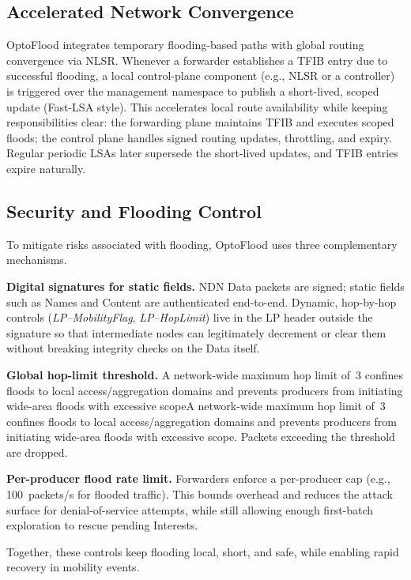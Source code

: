 \documentclass[10pt,conference]{IEEEtran}
\begin{document}
\subsection{Accelerated Network Convergence}
\label{sec:solution:convergence}

OptoFlood integrates temporary flooding-based paths with global routing convergence via NLSR. Whenever a forwarder establishes a TFIB entry due to successful flooding, a local control-plane component (e.g., NLSR or a controller) is triggered over the management namespace to publish a short-lived, scoped update (Fast-LSA style). This accelerates local route availability while keeping responsibilities clear: the forwarding plane maintains TFIB and executes scoped floods; the control plane handles signed routing updates, throttling, and expiry. Regular periodic LSAs later supersede the short-lived updates, and TFIB entries expire naturally.

\subsection{Security and Flooding Control}

To mitigate risks associated with flooding, OptoFlood uses three complementary mechanisms.

\textbf{Digital signatures for static fields.} NDN Data packets are signed; static fields such as Names and Content are authenticated end-to-end. Dynamic, hop-by-hop controls (\emph{LP--MobilityFlag}, \emph{LP--HopLimit}) live in the LP header outside the signature so that intermediate nodes can legitimately decrement or clear them without breaking integrity checks on the Data itself.

\textbf{Global hop-limit threshold.} A network-wide maximum hop limit of~3 confines floods to local access/aggregation domains and prevents producers from initiating wide-area floods with excessive scopeA network-wide maximum hop limit of~3 confines floods to local access/aggregation domains and prevents producers from initiating wide-area floods with excessive scope. Packets exceeding the threshold are dropped.

\textbf{Per-producer flood rate limit.} Forwarders enforce a per-producer cap (e.g., 100~packets/s for flooded traffic). This bounds overhead and reduces the attack surface for denial-of-service attempts, while still allowing enough first-batch exploration to rescue pending Interests.

Together, these controls keep flooding local, short, and safe, while enabling rapid recovery in mobility events.
\end{document}
